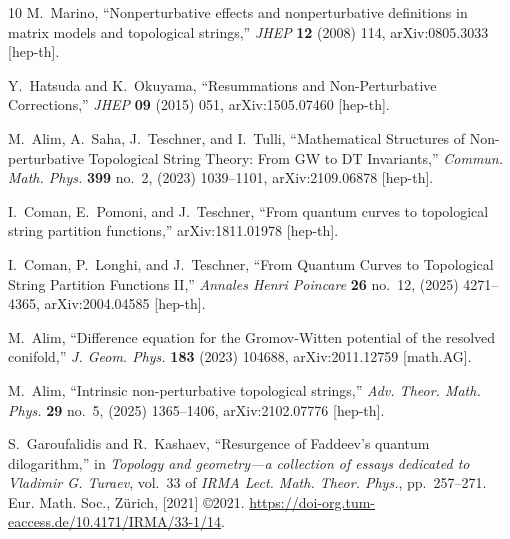 \documentclass[a4paper,12pt,justification=centering]{article}
\numberwithin{equation}{section}
\providecommand{\href}[2]{#2}
\theoremstyle{plain}%
\theoremstyle{definition}
\begin{document}
\begin{thebibliography}{10}
M.~Marino, ``{Nonperturbative effects and nonperturbative definitions in matrix
  models and topological strings},''
  \href{http://dx.doi.org/10.1088/1126-6708/2008/12/114}{{\em JHEP} {\bfseries
  12} (2008) 114}, \href{http://arxiv.org/abs/0805.3033}{{\ttfamily
  arXiv:0805.3033 [hep-th]}}.

Y.~Hatsuda and K.~Okuyama, ``{Resummations and Non-Perturbative Corrections},''
  \href{http://dx.doi.org/10.1007/JHEP09(2015)051}{{\em JHEP} {\bfseries 09}
  (2015) 051}, \href{http://arxiv.org/abs/1505.07460}{{\ttfamily
  arXiv:1505.07460 [hep-th]}}.

M.~Alim, A.~Saha, J.~Teschner, and I.~Tulli, ``{Mathematical Structures of
  Non-perturbative Topological String Theory: From GW to DT Invariants},''
  \href{http://dx.doi.org/10.1007/s00220-022-04571-y}{{\em Commun. Math. Phys.}
  {\bfseries 399} no.~2, (2023) 1039--1101},
  \href{http://arxiv.org/abs/2109.06878}{{\ttfamily arXiv:2109.06878
  [hep-th]}}.

I.~Coman, E.~Pomoni, and J.~Teschner, ``{From quantum curves to topological
  string partition functions},''
  \href{http://arxiv.org/abs/1811.01978}{{\ttfamily arXiv:1811.01978
  [hep-th]}}.

I.~Coman, P.~Longhi, and J.~Teschner, ``{From Quantum Curves to Topological
  String Partition Functions II},''
  \href{http://dx.doi.org/10.1007/s00023-025-01538-2}{{\em Annales Henri
  Poincare} {\bfseries 26} no.~12, (2025) 4271--4365},
  \href{http://arxiv.org/abs/2004.04585}{{\ttfamily arXiv:2004.04585
  [hep-th]}}.

M.~Alim, ``{Difference equation for the Gromov-Witten potential of the resolved
  conifold},'' \href{http://dx.doi.org/10.1016/j.geomphys.2022.104688}{{\em J.
  Geom. Phys.} {\bfseries 183} (2023) 104688},
  \href{http://arxiv.org/abs/2011.12759}{{\ttfamily arXiv:2011.12759
  [math.AG]}}.

M.~Alim, ``{Intrinsic non-perturbative topological strings},''
  \href{http://dx.doi.org/10.4310/atmp.251023013812}{{\em Adv. Theor. Math.
  Phys.} {\bfseries 29} no.~5, (2025) 1365--1406},
  \href{http://arxiv.org/abs/2102.07776}{{\ttfamily arXiv:2102.07776
  [hep-th]}}.

S.~Garoufalidis and R.~Kashaev,
  \href{http://dx.doi.org/10.4171/IRMA/33-1/14}{``Resurgence of {F}addeev's
  quantum dilogarithm,''} in {\em Topology and geometry---a collection of
  essays dedicated to {V}ladimir {G}. {T}uraev}, vol.~33 of {\em IRMA Lect.
  Math. Theor. Phys.}, pp.~257--271.
\newblock Eur. Math. Soc., Z\"urich, [2021] \copyright 2021.
\newblock \url{https://doi-org.tum-eaccess.de/10.4171/IRMA/33-1/14}.


\end{thebibliography}
\end{document}
